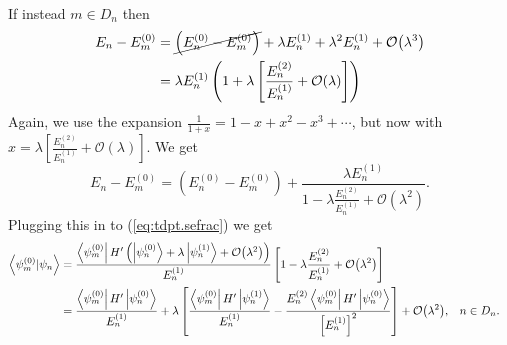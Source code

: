 \documentclass[11pt]{article}
\newcommand{\Od}[1]{\mathcal{O}{\left(#1\right)}}
\newcommand{\bra}[1]{\left\langle#1\right|}
\newcommand{\ket}[1]{\left|#1\right\rangle}
\newcommand{\braket}[2]{\left\langle#1|#2\right\rangle}
\theoremstyle{theorem}
\theoremstyle{remark}
\theoremstyle{step}
\theoremstyle{gap}
\begin{document}
If instead \(m \in D_n\) then
\begin{align*}
E_n - E_m^{(0)} &= \cancel{\left(E_n^{(0)} - E_m^{(0)}\right)} + \lambda E_n^{(1)} + \lambda^2 E_n^{(1)} + \Od{\lambda^3}\nonumber\\
&= \lambda E_n^{(1)} \left(1 + \lambda \left[\frac{E_n^{(2)}}{E_n^{(1)}} + \Od{\lambda} \right]\right)
\end{align*}
Again, we use the expansion \(\frac{1}{1+x} = 1 - x + x^2 - x^3 + \cdots\), but now with \(x = \lambda \left[\frac{E_n^{(2)}}{E_n^{(1)}} + \Od{\lambda}\right]\). We get
\[
E_n - E_m^{(0)} = \left(E_n^{(0)} - E_m^{(0)}\right) + \frac{\lambda E_n^{(1)}}{1 - \lambda \frac{E_n^{(2)}}{E_n^{(1)}} + \Od{\lambda^2}}.
\]
Plugging this in to (\ref{eq:tdpt.sefrac}) we get
\begin{align}
\braket{\psi_m^{(0)}}{\psi_n} &= \frac{\bra{\psi_m^{(0)}} H^\prime \left(\ksnp{n}{0} + \lambda \ksnp{n}{1} + \Od{\lambda^2}\right)}{E_n^{(1)}}\left[1- \lambda \frac{E_n^{(2)}}{E_n^{(1)}} + \Od{\lambda^2} \right] \nonumber\\
&= \frac{\bra{\psi_m^{(0)}} H^\prime \ket{\psi_n^{(0)}}}{E_n^{(1)}} + \lambda \left[\frac{\bra{\psi_m^{(0)}} H^\prime \ket{\psi_n^{(1)}}}{E_n^{(1)}} - \frac{E_n^{(2)} \bra{\psi_m^{(0)}} H^\prime \ket{\psi_n^{(0)}}}{{\left[E_n^{(1)}\right]}^2}\right] + \Od{\lambda^2},
&& n \in D_n. \label{eq:tdpt.Dn}
\end{align}
\end{document}
